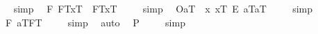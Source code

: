 \begin{isabellebody}
\isadelimproof
\ %
\endisadelimproof
%
\isatagproof
{}\isamarkupfalse%
\ simp\ \isamarkupfalse%
%
\endisatagproof
{\isafoldproof}%
%
\isadelimproof
%
\endisadelimproof
\isanewline
\isanewline
{}\isamarkupfalse%
\ {\isachardoublequoteopen}{\isacharbrackleft}{\isacharparenleft}\isactrlbold {\isasymforall}F{\isachardot}\ {\isasymlparr}F\isactrlsup T{\isacharcomma}x\isactrlsup T{\isasymrparr}\ \isactrlbold {\isasymequiv}\ {\isasymlparr}F\isactrlsup T{\isacharcomma}x\isactrlsup T{\isasymrparr}{\isacharparenright}{\isacharbrackright}\ {\isacharequal}\ {\isasymtop}{\isachardoublequoteclose}%
\isadelimproof
\ %
\endisadelimproof
%
\isatagproof
{}\isamarkupfalse%
\ simp\ \isamarkupfalse%
%
\endisatagproof
{\isafoldproof}%
%
\isadelimproof
%
\endisadelimproof
\isanewline
{}\isamarkupfalse%
\ {\isachardoublequoteopen}{\isacharbrackleft}{\isasymlparr}O{\isacharbang}{\isacharcomma}a\isactrlsup T{\isasymrparr}\ \isactrlbold {\isasymrightarrow}\ {\isasymlparr}{\isacharparenleft}\isactrlbold {\isasymlambda}x{\isachardot}\ {\isacharparenleft}x\isactrlsup T{\isacharparenright}\ \isactrlbold {\isacharequal}\isactrlsub E\ {\isacharparenleft}a\isactrlsup T{\isacharparenright}{\isacharparenright}{\isacharcomma}a\isactrlsup T{\isasymrparr}{\isacharbrackright}\ {\isacharequal}\ {\isasymtop}{\isachardoublequoteclose}%
\isadelimproof
\ %
\endisadelimproof
%
\isatagproof
{}\isamarkupfalse%
\ simp\ \isamarkupfalse%
%
\endisatagproof
{\isafoldproof}%
%
\isadelimproof
%
\endisadelimproof
\isanewline
\isanewline
{}\isamarkupfalse%
\ {\isachardoublequoteopen}{\isacharbrackleft}{\isacharparenleft}\isactrlbold {\isasymexists}F{\isachardot}\ {\isasymlbrace}a\isactrlsup T{\isacharcomma}F\isactrlsup T{\isasymrbrace}{\isacharparenright}{\isacharbrackright}\ {\isacharequal}\ {\isasymtop}{\isachardoublequoteclose}%
\isadelimproof
\ %
\endisadelimproof
%
\isatagproof
{}\isamarkupfalse%
\ simp\ \isamarkupfalse%
\ auto%
\endisatagproof
{\isafoldproof}%
%
\isadelimproof
%
\endisadelimproof
\isanewline
\isanewline
{}\isamarkupfalse%
\ {\isachardoublequoteopen}{\isacharbrackleft}{\isacharparenleft}\isactrlbold {\isasymexists}{\isasymphi}{\isachardot}\ {\isacharparenleft}{\isasymphi}\isactrlsup P{\isacharparenright}{\isacharparenright}{\isacharbrackright}\ {\isacharequal}\ {\isasymtop}{\isachardoublequoteclose}%
\isadelimproof
\ %
\endisadelimproof
%
\isatagproof
{}\isamarkupfalse%
\ simp\ \isamarkupfalse%

\end{isabellebody}
